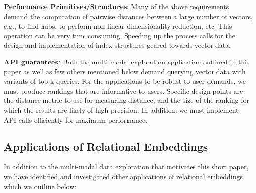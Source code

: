 \noindent\textbf{Performance Primitives/Structures:} Many of the above
requirements demand the computation of pairwise distances between a large number
of vectors, e.g., to find hubs, to perform non-linear dimensionality reduction,
etc. This operation can be very time consuming. Speeding up the process calls
for the design and implementation of index structures geared towards vector
data.

\noindent\textbf{API guarantees: }Both the multi-modal exploration application
outlined in this paper as well as few others mentioned below demand querying
vector data with variants of top-k queries. For the applications to be robust to
user demands, we must produce rankings that are informative to users. Specific
design points are the distance metric to use for measuring distance, and the size of
the ranking for which the results are likely of high precision. In addition, we
must implement API calls efficiently for maximum performance.



\subsection*{Applications of Relational Embeddings}

In addition to the multi-modal data exploration that motivates this short paper,
we have identified and investigated other applications of relational embeddings
which we outline below:

